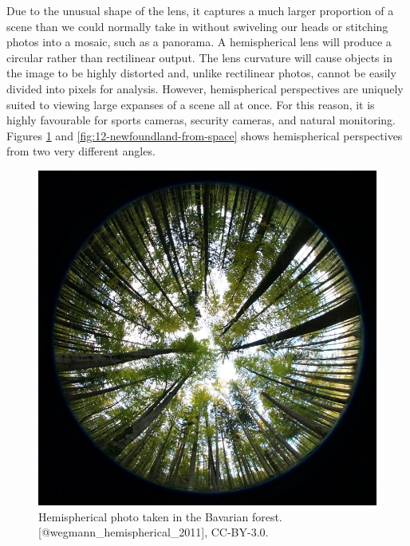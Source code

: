 \documentclass[
]{book}
\begin{document}
Due to the unusual shape of the lens, it captures a much larger proportion of a scene than we could normally take in without swiveling our heads or stitching photos into a mosaic, such as a panorama. A hemispherical lens will produce a circular rather than rectilinear output. The lens curvature will cause objects in the image to be highly distorted and, unlike rectilinear photos, cannot be easily divided into pixels for analysis. However, hemispherical perspectives are uniquely suited to viewing large expanses of a scene all at once. For this reason, it is highly favourable for sports cameras, security cameras, and natural monitoring. Figures \ref{fig:12-hemispherical-lens} and \ref{fig:12-newfoundland-from-space} shows hemispherical perspectives from two very different angles.

\begin{figure}
\includegraphics[width=0.9\linewidth]{images/12-hemispherical-lens} \caption{Hemispherical photo taken in the Bavarian forest. [@wegmann_hemispherical_2011], CC-BY-3.0.}\label{fig:12-hemispherical-lens}
\end{figure}
\end{document}
